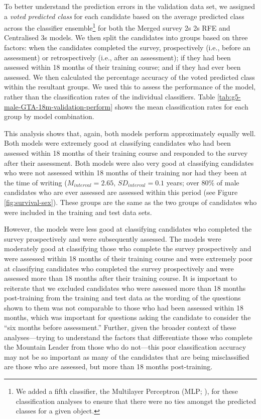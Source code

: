 \documentclass[
  12pt,
  a4paper,
]{book}
\begin{document}
To better understand the prediction errors in the validation data set, we assigned a \emph{voted predicted class} for each candidate based on the average predicted class across the classifier ensemble\footnote{We added a fifth classifier, the Multilayer Perceptron (MLP; \citet{Bishop2006}), for these classification analyses to ensure that there were no ties amongst the predicted classes for a given object.} for both the Merged survey 2s 2s RFE and Centralised 3s models. We then split the candidates into groups based on three factors: when the candidates completed the survey, prospectively (i.e., before an assessment) or retrospectively (i.e., after an assessment); if they had been assessed within 18 months of their training course; and if they had ever been assessed. We then calculated the percentage accuracy of the voted predicted class within the resultant groups. We used this to assess the performance of the model, rather than the classification rates of the individual classifiers. Table \ref{tab:g5-male-GTA-18m-validation-perform} shows the mean classification rates for each group by model combination.

This analysis shows that, again, both models perform approximately equally well. Both models were extremely good at classifying candidates who had been assessed within 18 months of their training course and responded to the survey after their assessment. Both models were also very good at classifying candidates who were not assessed within 18 months of their training nor had they been at the time of writing (\(M_{interval} = 2.65\), \(SD_{interval} = 0.1\) years; over 80\% of male candidates who are ever assessed are assessed within this period (see Figure \ref{fig:survival-sex}). These groups are the same as the two groups of candidates who were included in the training and test data sets.

However, the models were less good at classifying candidates who completed the survey prospectively and were subsequently assessed. The models were moderately good at classifying those who complete the survey prospectively and were assessed within 18 months of their training course and were extremely poor at classifying candidates who completed the survey prospectively and were assessed more than 18 months after their training course. It is important to reiterate that we excluded candidates who were assessed more than 18 months post-training from the training and test data as the wording of the questions shown to them was not comparable to those who had been assessed within 18 months, which was important for questions asking the candidate to consider the ``six months before assessment.'' Further, given the broader context of these analyses---trying to understand the factors that differentiate those who complete the Mountain Leader from those who do not---this poor classification accuracy may not be so important as many of the candidates that are being misclassified are those who are assessed, but more than 18 months post-training.
\end{document}
